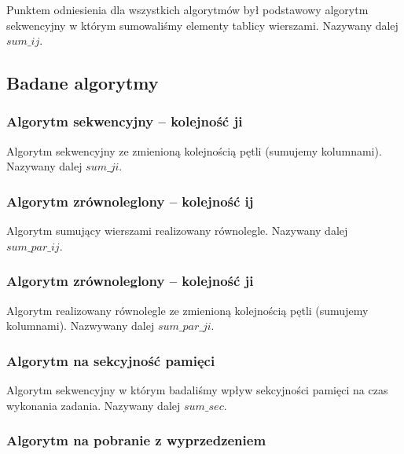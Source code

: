 Punktem odniesienia dla wszystkich algorytmów był podstawowy algorytm sekwencyjny w którym sumowaliśmy elementy tablicy wierszami. Nazywany dalej $sum\_ij$.




\subsection{Badane algorytmy}


\subsubsection{Algorytm sekwencyjny -- kolejność ji}

Algorytm sekwencyjny ze zmienioną kolejnością pętli (sumujemy kolumnami). Nazywany dalej $sum\_ji$.



\subsubsection{Algorytm zrównoleglony -- kolejność ij}

Algorytm sumujący wierszami realizowany równolegle. Nazywany dalej $sum\_par\_ij$.



\subsubsection{Algorytm zrównoleglony -- kolejność ji}

Algorytm realizowany równolegle ze zmienioną kolejnością pętli (sumujemy kolumnami). Nazwywany dalej $sum\_par\_ji$.



\subsubsection{Algorytm na sekcyjność pamięci}

Algorytm sekwencyjny w którym badaliśmy wpływ sekcyjności pamięci na czas wykonania zadania. Nazywany dalej $sum\_sec$.



\subsubsection{Algorytm na pobranie z wyprzedzeniem}

